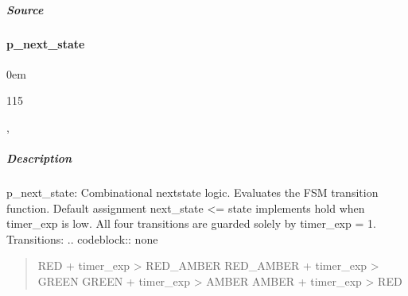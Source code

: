 \documentclass[letterpaper,10pt,english]{sphinxmanual}
\begin{document}
\noindent{}


\subparagraph{Source}
\label{\detokenize{modules/traffic_light/processes/p_state_reg:source}}
\begin{sphinxVerbatim}[commandchars=\\\{\}]
\end{sphinxVerbatim}

\sphinxstepscope


\paragraph{p\_next\_state}
\label{\detokenize{modules/traffic_light/processes/p_next_state:p-next-state}}\label{\detokenize{modules/traffic_light/processes/p_next_state::doc}}
\begin{DUlineblock}{0em}
\item[]  
\item[]  115
\item[]  
\item[]  , 
\end{DUlineblock}


\subparagraph{Description}
\label{\detokenize{modules/traffic_light/processes/p_next_state:description}}
\sphinxAtStartPar
p\_next\_state: Combinational next\sphinxhyphen{}state logic.
Evaluates the FSM transition function. Default assignment
next\_state \textless{}= state implements hold when timer\_exp is low.
All four transitions are guarded solely by timer\_exp = 1.
Transitions:
.. code\sphinxhyphen{}block:: none
\begin{quote}

\sphinxAtStartPar
RED       + timer\_exp \sphinxhyphen{}\textgreater{} RED\_AMBER
RED\_AMBER + timer\_exp \sphinxhyphen{}\textgreater{} GREEN
GREEN     + timer\_exp \sphinxhyphen{}\textgreater{} AMBER
AMBER     + timer\_exp \sphinxhyphen{}\textgreater{} RED
\end{quote}
\end{document}
